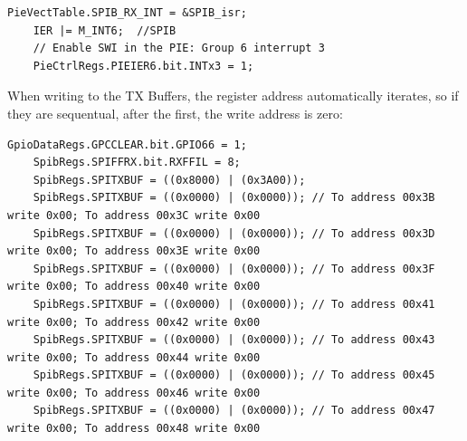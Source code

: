 \documentclass{article}
\begin{document}
\begin{lstlisting}[style=CStyle]
    PieVectTable.SPIB_RX_INT = &SPIB_isr;
    IER |= M_INT6;  //SPIB
    // Enable SWI in the PIE: Group 6 interrupt 3
    PieCtrlRegs.PIEIER6.bit.INTx3 = 1;
\end{lstlisting}

When writing to the TX Buffers, the register address automatically iterates, so if they are sequentual, after the first, the write address is zero:

\begin{lstlisting}[style=CStyle]
    GpioDataRegs.GPCCLEAR.bit.GPIO66 = 1;
    SpibRegs.SPIFFRX.bit.RXFFIL = 8;
    SpibRegs.SPITXBUF = ((0x8000) | (0x3A00));
    SpibRegs.SPITXBUF = ((0x0000) | (0x0000)); // To address 00x3B write 0x00; To address 00x3C write 0x00
    SpibRegs.SPITXBUF = ((0x0000) | (0x0000)); // To address 00x3D write 0x00; To address 00x3E write 0x00
    SpibRegs.SPITXBUF = ((0x0000) | (0x0000)); // To address 00x3F write 0x00; To address 00x40 write 0x00
    SpibRegs.SPITXBUF = ((0x0000) | (0x0000)); // To address 00x41 write 0x00; To address 00x42 write 0x00
    SpibRegs.SPITXBUF = ((0x0000) | (0x0000)); // To address 00x43 write 0x00; To address 00x44 write 0x00
    SpibRegs.SPITXBUF = ((0x0000) | (0x0000)); // To address 00x45 write 0x00; To address 00x46 write 0x00
    SpibRegs.SPITXBUF = ((0x0000) | (0x0000)); // To address 00x47 write 0x00; To address 00x48 write 0x00
\end{lstlisting}
\end{document}
